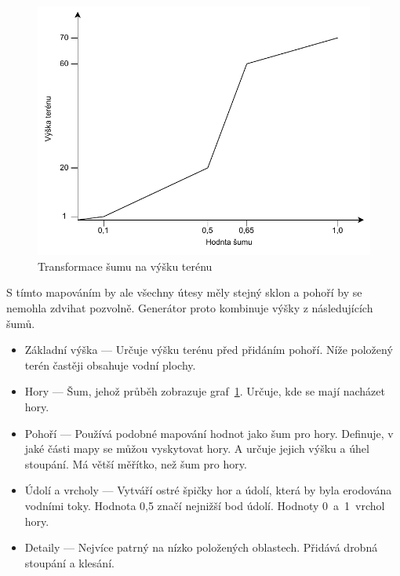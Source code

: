 \documentclass[thesis=M,czech]{FITthesis}[2019/12/23]
\begin{document}
\begin{figure}\centering
	\includegraphics[width=\textwidth]{images/world_gen/noise_to_height}
	\caption[Transformace šumu na výšku terénu]{Transformace šumu na výšku terénu}\label{fig:noise_to_height}
\end{figure}

S tímto mapováním by ale všechny útesy měly stejný sklon a pohoří by se nemohla zdvihat pozvolně. Generátor proto kombinuje výšky z následujících šumů.

\begin{itemize}
\item Základní výška --- Určuje výšku terénu před přidáním pohoří. Níže položený terén častěji obsahuje vodní plochy.

\item Hory --- Šum, jehož průběh zobrazuje graf~\ref{fig:noise_to_height}. Určuje, kde se mají nacházet hory.

\item Pohoří --- Používá podobné mapování hodnot jako šum pro hory. Definuje, v jaké části mapy se můžou vyskytovat hory. A určuje jejich výšku a úhel stoupání. Má větší měřítko, než šum pro hory. 

\item Údolí a vrcholy --- Vytváří ostré špičky hor a údolí, která by byla erodována vodními toky. Hodnota 0,5 značí nejnižší bod údolí. Hodnoty 0~a~1~vrchol hory.

\item Detaily --- Nejvíce patrný na nízko položených oblastech. Přidává drobná stoupání a klesání.
\end{itemize}
\end{document}
